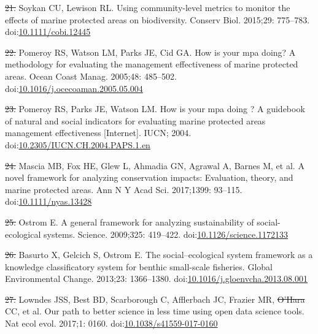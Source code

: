 \documentclass[12pt,]{article}
\providecommand{\DIFaddtex}[1]{{\protect\color{blue}\uwave{#1}}} %
\providecommand{\DIFdeltex}[1]{{\protect\color{red}\sout{#1}}}                      %
\providecommand{\DIFaddbegin}{} %
\providecommand{\DIFaddend}{} %
\providecommand{\DIFdelbegin}{} %
\providecommand{\DIFdelend}{} %
\providecommand{\DIFadd}[1]{\texorpdfstring{\DIFaddtex{#1}}{#1}} %
\providecommand{\DIFdel}[1]{\texorpdfstring{\DIFdeltex{#1}}{}} %
\newcommand{\DIFscaledelfig}{0.5}
\newlength{\DIFdelgraphicswidth} %
\newlength{\DIFdelgraphicsheight} %
\newcommand{\DIFaddincludegraphics}[2][]{{\color{blue}\fbox{\DIFOincludegraphics[#1]{#2}}}} %
\newcommand{\DIFdelincludegraphics}[2][]{%
\sbox{\DIFdelgraphicsbox}{\DIFOincludegraphics[#1]{#2}}%
\settoboxwidth{\DIFdelgraphicswidth}{\DIFdelgraphicsbox} %
\settoboxtotalheight{\DIFdelgraphicsheight}{\DIFdelgraphicsbox} %
\scalebox{\DIFscaledelfig}{%
\parbox[b]{\DIFdelgraphicswidth}{\usebox{\DIFdelgraphicsbox}\\[-\baselineskip] \rule{\DIFdelgraphicswidth}{0em}}\llap{\resizebox{\DIFdelgraphicswidth}{\DIFdelgraphicsheight}{%
\setlength{\unitlength}{\DIFdelgraphicswidth}%
\begin{picture}(1,1)%
\thicklines\linethickness{2pt} %
{\color[rgb]{1,0,0}\put(0,0){\framebox(1,1){}}}%
{\color[rgb]{1,0,0}\put(0,0){\line( 1,1){1}}}%
{\color[rgb]{1,0,0}\put(0,1){\line(1,-1){1}}}%
\end{picture}%
}\hspace*{3pt}}} %
} %
\DeclareRobustCommand{\DIFaddbegin}{\DIFOaddbegin \let\includegraphics\DIFaddincludegraphics} %
\DeclareRobustCommand{\DIFaddend}{\DIFOaddend \let\includegraphics\DIFOincludegraphics} %
\DeclareRobustCommand{\DIFdelbegin}{\DIFOdelbegin \let\includegraphics\DIFdelincludegraphics} %
\DeclareRobustCommand{\DIFdelend}{\DIFOaddend \let\includegraphics\DIFOincludegraphics} %
\begin{document}
\hypertarget{ref-soykan_2015-nu}{}
\DIFdelbegin \DIFdel{21. }\DIFdelend \DIFaddbegin \DIFadd{22. }\DIFaddend Soykan CU, Lewison RL. Using community-level metrics to monitor the
effects of marine protected areas on biodiversity. Conserv Biol.
2015;29: 775--783.
doi:\href{https://doi.org/10.1111/cobi.12445}{10.1111/cobi.12445}

\hypertarget{ref-pomeroy_2005-Py}{}
\DIFdelbegin \DIFdel{22. }\DIFdelend \DIFaddbegin \DIFadd{23. }\DIFaddend Pomeroy RS, Watson LM, Parks JE, Cid GA. How is your mpa doing? A
methodology for evaluating the management effectiveness of marine
protected areas. Ocean Coast Manag. 2005;48: 485--502.
doi:\href{https://doi.org/10.1016/j.ocecoaman.2005.05.004}{10.1016/j.ocecoaman.2005.05.004}

\hypertarget{ref-pomeroy_2004-23}{}
\DIFdelbegin \DIFdel{23. }\DIFdelend \DIFaddbegin \DIFadd{24. }\DIFaddend Pomeroy RS, Parks JE, Watson LM. How is your mpa doing ? A guidebook
of natural and social indicators for evaluating marine protected areas
management effectiveness {[}Internet{]}. IUCN; 2004.
doi:\href{https://doi.org/10.2305/IUCN.CH.2004.PAPS.1.en}{10.2305/IUCN.CH.2004.PAPS.1.en}

\hypertarget{ref-mascia_2017-m_}{}
\DIFdelbegin \DIFdel{24. }\DIFdelend \DIFaddbegin \DIFadd{25. }\DIFaddend Mascia MB, Fox HE, Glew L, Ahmadia GN, Agrawal A, Barnes M, et al. A
novel framework for analyzing conservation impacts: Evaluation, theory,
and marine protected areas. Ann N Y Acad Sci. 2017;1399: 93--115.
doi:\href{https://doi.org/10.1111/nyas.13428}{10.1111/nyas.13428}

\hypertarget{ref-ostrom_2009-hg}{}
\DIFdelbegin \DIFdel{25. }\DIFdelend \DIFaddbegin \DIFadd{26. }\DIFaddend Ostrom E. A general framework for analyzing sustainability of
social-ecological systems. Science. 2009;325: 419--422.
doi:\href{https://doi.org/10.1126/science.1172133}{10.1126/science.1172133}

\hypertarget{ref-basurto_2013-oq}{}
\DIFdelbegin \DIFdel{26. }\DIFdelend \DIFaddbegin \DIFadd{27. }\DIFaddend Basurto X, Gelcich S, Ostrom E. The social--ecological system
framework as a knowledge classificatory system for benthic small-scale
fisheries. Global Environmental Change. 2013;23: 1366--1380.
doi:\href{https://doi.org/10.1016/j.gloenvcha.2013.08.001}{10.1016/j.gloenvcha.2013.08.001}

\hypertarget{ref-lowndes_2017-xh}{}
\DIFdelbegin \DIFdel{27. }\DIFdelend \DIFaddbegin \DIFadd{28. }\DIFaddend Lowndes JSS, Best BD, Scarborough C, Afflerbach JC, Frazier MR,
\DIFdelbegin \DIFdel{O'Hara }\DIFdelend \DIFaddbegin \DIFadd{OHara }\DIFaddend CC, et al. Our path to better science in less time using open data
science tools. Nat ecol evol. 2017;1: 0160.
doi:\href{https://doi.org/10.1038/s41559-017-0160}{10.1038/s41559-017-0160}
\end{document}
